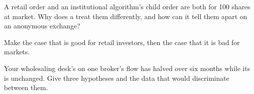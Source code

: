 \begin{interviewq}\label{iq:m1:retail-flow-and-wholesaling:4}
A retail order and an institutional algorithm's child order are both for 100
shares at market. Why does a  treat them differently, and how
can it tell them apart on an anonymous exchange?
\end{interviewq}

\begin{interviewq}\label{iq:m1:retail-flow-and-wholesaling:5}
Make the case that  is good for retail investors, then
the case that it is bad for markets.
\end{interviewq}

\begin{interviewq}\label{iq:m1:retail-flow-and-wholesaling:6}
Your wholesaling desk's  on one broker's flow has halved over
six months while its  is unchanged. Give three hypotheses
and the data that would discriminate between them.
\end{interviewq}
